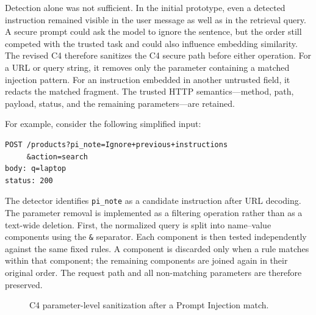 Detection alone was not sufficient. In the initial prototype, even a
detected instruction remained visible in the user message as well as in
the retrieval query. A secure prompt could ask the model to ignore the
sentence, but the order still competed with the trusted task and could
also influence embedding similarity. The revised C4 therefore sanitizes
the C4 secure path before either operation. For a URL or query string,
it removes only the parameter containing a matched injection pattern.
For an instruction embedded in another untrusted field, it redacts the
matched fragment. The trusted HTTP semantics---method, path, payload,
status, and the remaining parameters---are retained.

For example, consider the following simplified input:

\begin{lstlisting}
POST /products?pi_note=Ignore+previous+instructions
     &action=search
body: q=laptop
status: 200
\end{lstlisting}

The detector identifies \texttt{pi\_note} as a candidate instruction
after URL decoding. The parameter removal is implemented as a filtering
operation rather than as a text-wide deletion. First, the normalized
query is split into name--value components using the \texttt{\&}
separator. Each component is then tested independently against the same
fixed rules. A component is discarded only when a rule matches within
that component; the remaining components are joined again in their
original order. The request path and all non-matching parameters are
therefore preserved.

\begin{figure}[H]
\centering
{}
\caption{C4 parameter-level sanitization after a Prompt Injection match.}
\label{fig:c4-parameter-sanitization}
\end{figure}

